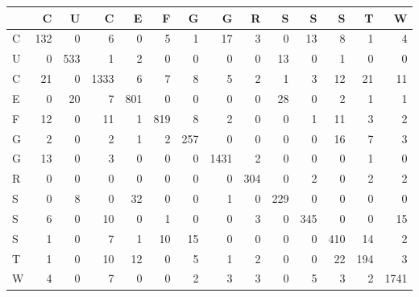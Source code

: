 \begin{tabular}{lrrrrrrrrrrrrr}
\toprule
{} &    C &    U &     C &    E &    F &    G &     G &    R &    S &    S &    S &    T &     W \\
\midrule
C &  132 &    0 &     6 &    0 &    5 &    1 &    17 &    3 &    0 &   13 &    8 &    1 &     4 \\
U &    0 &  533 &     1 &    2 &    0 &    0 &     0 &    0 &   13 &    0 &    1 &    0 &     0 \\
C &   21 &    0 &  1333 &    6 &    7 &    8 &     5 &    2 &    1 &    3 &   12 &   21 &    11 \\
E &    0 &   20 &     7 &  801 &    0 &    0 &     0 &    0 &   28 &    0 &    2 &    1 &     1 \\
F &   12 &    0 &    11 &    1 &  819 &    8 &     2 &    0 &    0 &    1 &   11 &    3 &     2 \\
G &    2 &    0 &     2 &    1 &    2 &  257 &     0 &    0 &    0 &    0 &   16 &    7 &     3 \\
G &   13 &    0 &     3 &    0 &    0 &    0 &  1431 &    2 &    0 &    0 &    0 &    1 &     0 \\
R &    0 &    0 &     0 &    0 &    0 &    0 &     0 &  304 &    0 &    2 &    0 &    2 &     2 \\
S &    0 &    8 &     0 &   32 &    0 &    0 &     1 &    0 &  229 &    0 &    0 &    0 &     0 \\
S &    6 &    0 &    10 &    0 &    1 &    0 &     0 &    3 &    0 &  345 &    0 &    0 &    15 \\
S &    1 &    0 &     7 &    1 &   10 &   15 &     0 &    0 &    0 &    0 &  410 &   14 &     2 \\
T &    1 &    0 &    10 &   12 &    0 &    5 &     1 &    2 &    0 &    0 &   22 &  194 &     3 \\
W &    4 &    0 &     7 &    0 &    0 &    2 &     3 &    3 &    0 &    5 &    3 &    2 &  1741 \\
\bottomrule
\end{tabular}

